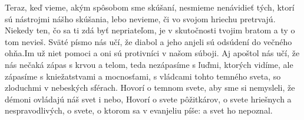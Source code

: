 Teraz, keď vieme, akým spôsobom sme skúšaní, nesmieme nenávidieť tých, ktorí sú nástrojmi nášho skúšania, lebo nevieme, či vo svojom hriechu pretrvajú.
Niekedy ten, čo sa ti zdá byť nepriateľom, je v skutočnosti tvojim bratom a ty o tom nevieš.
Sväté písmo nás učí, že diabol a jeho anjeli sú odsúdení do večného ohňa.Im už niet pomoci a oni sú protivníci v našom súboji. Aj apoštol nás učí, že nás nečaká zápas s krvou a telom, teda nezápasíme s ľuďmi, ktorých vidíme, ale zápasíme s kniežatstvami a mocnosťami, s vládcami tohto temného sveta, so zloduchmi v nebeských sférach. Hovorí o temnom svete, aby sme si nemysleli, že démoni ovládajú náš svet i nebo, Hovorí o svete pôžitkárov, o svete hriešnych a nespravodlivých, o svete, o ktorom sa v evanjeliu píše: a svet ho nepoznal. 